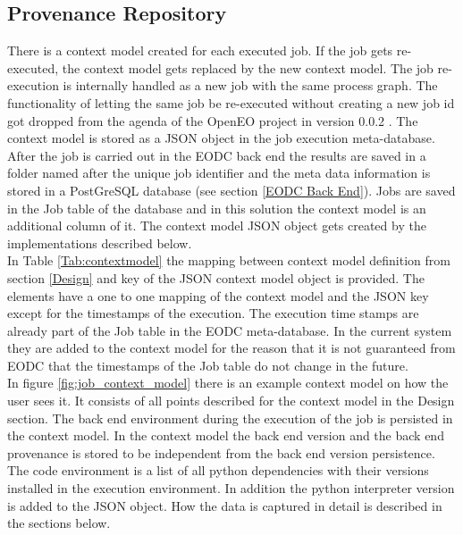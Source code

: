 \documentclass[draft,final]{vutinfth} %
\begin{document}
\subsection{Provenance Repository}\label{Implementation:Provenance Repository}
There is a context model created for each executed job. If the job gets re-executed, the context model gets replaced by the new context model. The job re-execution is internally handled as a new job with the same process graph. The functionality of letting the same job be re-executed without creating a new job id got dropped from the agenda of the OpenEO project in version 0.0.2 \cite{openeo_api_desc}. 
The context model is stored as a JSON object in the job execution meta-database. After the job is carried out in the EODC back end the results are saved in a folder named after the unique job identifier and the meta data information is stored in a PostGreSQL database (see section  \ref{EODC Back End}). Jobs are saved in the Job table of the database and in this solution the context model is an additional column of it. The context model JSON object gets created by the implementations described below. \\
In Table \ref{Tab:contextmodel} the mapping between context model definition from section \ref{Design} and key of the JSON context model object is provided. The elements have a one to one mapping of the context model and the JSON key except for the timestamps of the execution. The execution time stamps are already part of the Job table in the EODC meta-database. In the current system they are added to the context model for the reason that it is not guaranteed from EODC that the timestamps of the Job table do not change in the future.\\
In figure \ref{fig:job_context_model} there is an example context model on how the user sees it. It consists of all points described for the context model in the Design section. The back end environment during the execution of the job is persisted in the context model. In the context model the back end version and the back end provenance is stored to be independent from the back end version persistence. The code environment is a list of all python dependencies with their versions installed in the execution environment. In addition the python interpreter version is added to the JSON object. How the data is captured in detail is described in the sections below.    
 
 
 
\end{document}

